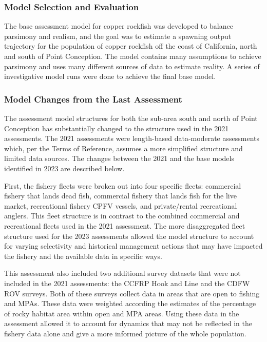 \documentclass[11pt,
  english,
  letterpaper,
]{article}
\begin{document}
\hypertarget{model-selection-and-evaluation}{%
\subsubsection{Model Selection and Evaluation}\label{model-selection-and-evaluation}}

The base assessment model for copper rockfish was developed to balance parsimony and realism, and the goal was to estimate a spawning output trajectory for the population of copper rockfish off the coast of California, north and south of Point Conception. The model contains many assumptions to achieve parsimony and uses many different sources of data to estimate reality. A series of investigative model runs were done to achieve the final base model.

\hypertarget{model-changes-from-the-last-assessment}{%
\subsubsection{Model Changes from the Last Assessment}\label{model-changes-from-the-last-assessment}}

The assessment model structures for both the sub-area south and north of Point Conception has substantially changed to the structure used in the 2021 assessments. The 2021 assessments were length-based data-moderate assessments which, per the Terms of Reference, assumes a more simplified structure and limited data sources. The changes between the 2021 and the base models identified in 2023 are described below.

First, the fishery fleets were broken out into four specific fleets: commercial fishery that lands dead fish, commercial fishery that lands fish for the live market, recreational fishery CPFV vessels, and private/rental recreational anglers. This fleet structure is in contrast to the combined commercial and recreational fleets used in the 2021 assessment. The more disaggregated fleet structure used for the 2023 assessments allowed the model structure to account for varying selectivity and historical management actions that may have impacted the fishery and the available data in specific ways.

This assessment also included two additional survey datasets that were not included in the 2021 assessments: the CCFRP Hook and Line and the CDFW ROV surveys. Both of these surveys collect data in areas that are open to fishing and MPAs. These data were weighted according the estimates of the percentage of rocky habitat area within open and MPA areas. Using these data in the assessment allowed it to account for dynamics that may not be reflected in the fishery data alone and give a more informed picture of the whole population.
\end{document}
